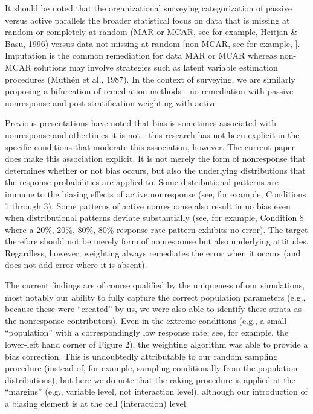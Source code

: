 \documentclass[
  man,mask]{apa7}
\begin{document}
It should be noted that the organizational surveying categorization of passive versus active parallels the broader statistical focus on data that is missing at random or completely at random (MAR or MCAR, see for example, Heitjan \& Basu, 1996) versus data not missing at random {[}non-MCAR, see for example, {]}. Imputation is the common remediation for data MAR or MCAR whereas non-MCAR solutions may involve strategies such as latent variable estimation procedures (Muthén et al., 1987). In the context of surveying, we are similarly proposing a bifurcation of remediation methods - no remediation with passive nonresponse and post-stratification weighting with active.

Previous presentations have noted that bias is sometimes associated with nonresponse and othertimes it is not - this research has not been explicit in the specific conditions that moderate this association, however. The current paper does make this association explicit. It is not merely the form of nonresponse that determines whether or not bias occurs, but also the underlying distributions that the response probabilities are applied to. Some distributional patterns are immune to the biasing effects of active nonresponse (see, for example, Conditions 1 through 3). Some patterns of active nonresponse also result in no bias even when distributional patterns deviate substantially (see, for example, Condition 8 where a 20\%, 20\%, 80\%, 80\% response rate pattern exhibits no error). The target therefore should not be merely form of nonresponse but also underlying attitudes. Regardless, however, weighting always remediates the error when it occurs (and does not add error where it is absent).

The current findings are of course qualified by the uniqueness of our simulations, most notably our ability to fully capture the correct population parameters (e.g., because these were ``created'' by us, we were also able to identify these strata as the nonresponse contributors). Even in the extreme conditions (e.g., a small ``population'' with a correspondingly low response rate; see, for example, the lower-left hand corner of Figure 2), the weighting algorithm was able to provide a bias correction. This is undoubtedly attributable to our random sampling procedure (instead of, for example, sampling conditionally from the population distributions), but here we do note that the raking procedure is applied at the ``margins'' (e.g., variable level, not interaction level), although our introduction of a biasing element is at the cell (interaction) level.
\end{document}
